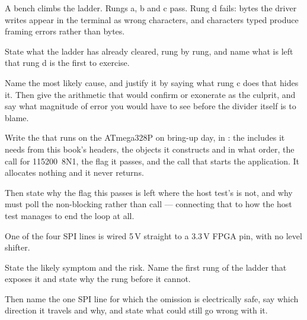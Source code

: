  A bench climbs the ladder. Rungs a, b and c pass. Rung d fails: bytes the driver writes
appear in the terminal as wrong characters, and characters typed produce framing errors rather than
bytes.

State what the ladder has already cleared, rung by rung, and name what is left that rung d is the
first to exercise.

Name the most likely cause, and justify it by saying what rung c does that hides it. Then give the
arithmetic that would confirm or exonerate  as the culprit, and say what
magnitude of error you would have to see before the divider itself is to blame. 

 Write the  that runs on the ATmega328P on bring-up day, in :
the includes it needs from this book's headers, the objects it constructs and in what order, the
 call for 115200~8N1, the flag it passes, and the call that starts the
application. It allocates nothing and it never returns.

Then state why the flag this  passes is left  where the host test's is not,
and why  must poll the non-blocking  rather than call
 --- connecting that to how the host test manages to end the loop at all.

 One of the four SPI lines is wired 5\,V straight to a 3.3\,V FPGA pin, with no level
shifter.

State the likely symptom and the risk. Name the first rung of the ladder that exposes it and state
why the rung before it cannot.

Then name the one SPI line for which the omission is electrically safe, say which direction it
travels and why, and state what could still go wrong with it. 
